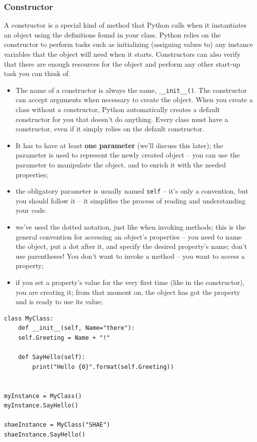 \documentclass[11pt]{article}
\begin{document}
\subsubsection{Constructor}
\label{sec:org12e69aa}
A constructor is a special kind of method that Python calls when it
instantiates an object using the definitions found in your
class. Python relies on the constructor to perform tasks such as
initializing (assigning values to) any instance variables that the
object will need when it starts. Constructors can also verify that
there are enough resources for the object and perform any other
start-up task you can think of.

\begin{itemize}
\item The name of a constructor is always the same, \texttt{\_\_init\_\_()}. The
constructor can accept arguments when necessary to create the
object. When you create a class without a constructor, Python
automatically creates a default constructor for you that doesn’t do
anything. Every class must have a constructor, even if it simply
relies on the default constructor.
\item It has to have at least \textbf{one parameter} (we’ll discuss this later);
the parameter is used to represent the newly created object – you
can use the parameter to manipulate the object, and to enrich it
with the needed properties;
\item the obligatory parameter is usually named \texttt{self} – it’s only a
convention, but you should follow it – it simplifies the process of
reading and understanding your code.
\item we’ve used the dotted notation, just like when invoking methods;
this is the general convention for accessing an object’s properties
– you need to name the object, put a dot after it, and specify the
desired property’s name; don’t use parentheses! You don’t want to
invoke a method – you want to access a property;
\item if you set a property’s value for the very first time (like in the
constructor), you are creating it; from that moment on, the object
has got the property and is ready to use its value;
\end{itemize}

\begin{verbatim}
class MyClass:
    def __init__(self, Name="there"):
	self.Greeting = Name + "!"

    def SayHello(self):
	    print("Hello {0}".format(self.Greeting))


myInstance = MyClass()
myInstance.SayHello()

shaeInstance = MyClass("SHAE")
shaeInstance.SayHello()
\end{verbatim}
\end{document}
